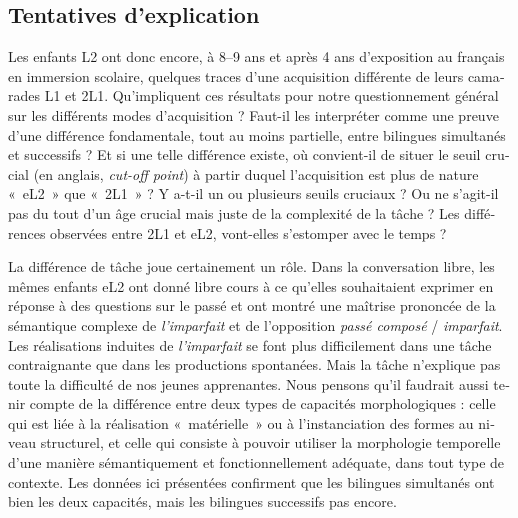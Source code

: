 \documentclass[french, output=paper]{langscibook}
\begin{document}
\begin{otherlanguage}{french}
\subsection{Tentatives d’explication}\label{sec:kihlstedt:6.3}

Les enfants L2 ont donc encore, à 8--9 ans et après 4 ans d’exposition au français en immersion scolaire, quelques traces d’une acquisition différente de leurs camarades L1 et 2L1. Qu’impliquent ces résultats pour notre questionnement général sur les différents modes d’acquisition ?  Faut-il les interpréter comme une preuve d’une différence fondamentale, tout au moins partielle, entre bilingues simultanés et successifs ? Et si une telle différence existe, où convient-il de situer le seuil crucial (en anglais, \textit{cut-off point}) à partir duquel l’acquisition est plus de nature «~eL2~» que «~2L1~» ? Y a-t-il un ou plusieurs seuils cruciaux ? Ou ne s’agit-il pas du tout d’un âge crucial mais juste de la complexité de la tâche ? Les différences observées entre 2L1 et eL2, vont-elles s’estomper avec le temps ? 



La différence de tâche joue certainement un rôle. Dans la conversation libre, les mêmes enfants eL2 ont donné libre cours à ce qu’elles souhaitaient exprimer en réponse à des questions sur le passé et ont montré une maîtrise prononcée de la sémantique complexe de \textit{l’imparfait} et de l’opposition \textit{passé composé} / \textit{imparfait}. Les réalisations induites de \textit{l’imparfait} se font plus difficilement dans une tâche contraignante que dans les productions spontanées. Mais la tâche n’explique pas toute la difficulté de nos jeunes apprenantes. Nous pensons qu’il faudrait aussi tenir compte de la différence entre deux types de capacités morphologiques : celle qui est liée à la réalisation «~matérielle~» ou à l’instanciation des formes au niveau structurel, et celle qui consiste à pouvoir utiliser la morphologie temporelle d’une manière sémantiquement et fonctionnellement adéquate, dans tout type de contexte. Les données ici présentées confirment que les bilingues simultanés ont bien les deux capacités, mais les bilingues successifs pas encore. 


\end{otherlanguage}
\end{document}
